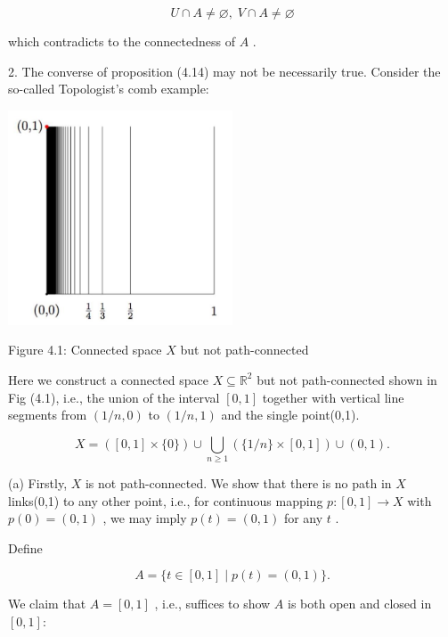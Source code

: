 \[
U \cap  A \neq  \varnothing ,\;V \cap  A \neq  \varnothing
\]

which contradicts to the connectedness of \(A\) .

2. The converse of proposition (4.14) may not be necessarily true. Consider the so-called Topologist's comb example:

\begin{center}
\includegraphics[max width=0.5\textwidth]{images/bo_d2bcsrref24c73avs720_52_671_318_639_611_0.jpg}
\end{center}
\hspace*{3em} 

Figure 4.1: Connected space \(X\) but not path-connected

Here we construct a connected space \(X \subseteq  {\mathbb{R}}^{2}\) but not path-connected shown in Fig (4.1), i.e., the union of the interval \(\left\lbrack  {0,1}\right\rbrack\) together with vertical line segments from \(\left( {1/n,0}\right)\) to \(\left( {1/n,1}\right)\) and the single point(0,1).

\[
X = \left( {\left\lbrack  {0,1}\right\rbrack  \times \{ 0\} }\right)  \cup  \mathop{\bigcup }\limits_{{n \geq  1}}\left( {\{ 1/n\}  \times  \left\lbrack  {0,1}\right\rbrack  }\right)  \cup  \left( {0,1}\right) .
\]

(a) Firstly, \(X\) is not path-connected. We show that there is no path in \(X\) links(0,1) to any other point, i.e., for continuous mapping \(p : \left\lbrack  {0,1}\right\rbrack   \rightarrow  X\) with \(p\left( 0\right)  = \left( {0,1}\right)\) , we may imply \(p\left( t\right)  = \left( {0,1}\right)\) for any \(t\) .

Define

\[
A = \{ t \in  \left\lbrack  {0,1}\right\rbrack   \mid  p\left( t\right)  = \left( {0,1}\right) \} .
\]

We claim that \(A = \left\lbrack  {0,1}\right\rbrack\) , i.e., suffices to show \(A\) is both open and closed in \(\left\lbrack  {0,1}\right\rbrack   :\)

